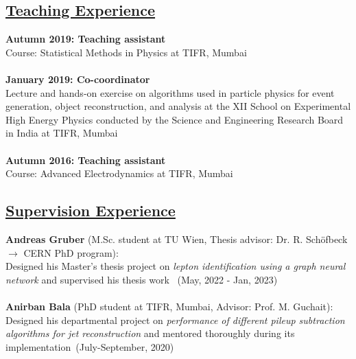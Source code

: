 \documentclass[a4paper,11pt]{article}
\begin{document}
{
\subsection*{\underline{Teaching Experience}}

\textbf{Autumn 2019: Teaching assistant}\\
Course: Statistical Methods in Physics at TIFR, Mumbai \\
\\
\textbf{January 2019: Co-coordinator}\\
Lecture and hands-on exercise on algorithms used in particle physics for event generation, object reconstruction, and analysis
at the XII School on Experimental High Energy Physics conducted by the Science and Engineering Research Board in India at TIFR, Mumbai \\
\\
\textbf{Autumn 2016: Teaching assistant}\\
Course: Advanced Electrodynamics at TIFR, Mumbai
\\

\subsection*{\underline{Supervision Experience}}

\textbf{Andreas Gruber} (M.Sc. student at TU Wien, Thesis advisor: Dr. R. Sch{\"o}fbeck $\rightarrow$ CERN PhD program):\\
Designed his Master's thesis project on \textit{lepton identification using a graph neural network} and supervised his thesis work ~(May, 2022 - Jan, 2023)\\
\\
\textbf{Anirban Bala} (PhD student at TIFR, Mumbai, Advisor: Prof. M. Guchait):\\
Designed his departmental project on \textit{performance of different pileup subtraction algorithms for jet reconstruction} and mentored thoroughly during its implementation~(July-September, 2020)

}
\end{document}
